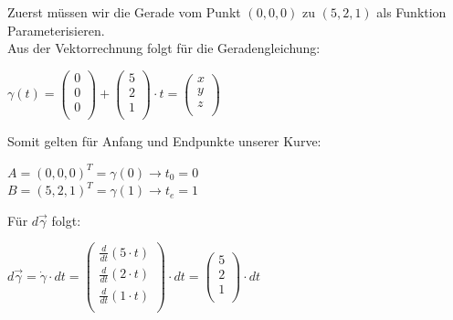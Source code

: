 \beginbsp
Zuerst müssen wir die Gerade vom Punkt $(0,0,0)$ zu $(5,2,1)$ als Funktion Parameterisieren. \\
Aus der Vektorrechnung folgt für die Geradengleichung:
\begin{center}
	$\gamma(t) = \left(\begin{array}{c} 0 \\ 0\\ 0\\ \end{array}\right)  +  \left(\begin{array}{c} 5 \\ 2\\ 1\\ \end{array}\right) \cdot t = \left(\begin{array}{c} x \\ y\\ z\\ \end{array}\right)$
\end{center}
Somit gelten für Anfang und Endpunkte unserer Kurve:
\begin{center}
	$A = (0,0,0)^T = \gamma(0) \rightarrow t_0 = 0$ \\
	$B = (5,2,1)^T = \gamma(1) \rightarrow t_e = 1$
\end{center}

Für $d\vec{\gamma}$ folgt:
\begin{center}
	$ \displaystyle d\vec{\gamma} = \dot{\gamma} \cdot dt = \left(\begin{array}{c} \frac{d}{dt}(5 \cdot t) \\ \frac{d}{dt}(2 \cdot t)\\ \frac{d}{dt}(1 \cdot t)\\ \end{array}\right) \cdot dt = \left(\begin{array}{c} 5 \\ 2\\ 1\\ \end{array}\right) \cdot dt$
\end{center}

